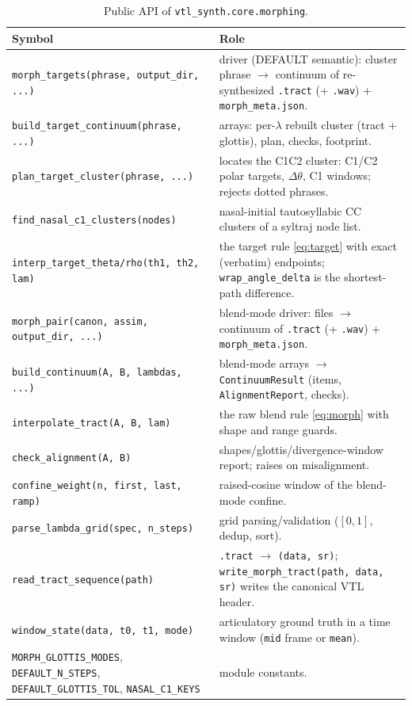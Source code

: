 \documentclass[11pt,a4paper]{article}
\newcommand{\lam}{\lambda}
\newcommand{\code}[1]{\texttt{#1}}
\begin{document}
\begin{table}[t]
\centering\small
\caption{Public API of \code{vtl\_synth.core.morphing}.}\label{tab:api}
\begin{tabularx}{\textwidth}{@{}>{\raggedright\arraybackslash}p{5.9cm} >{\raggedright\arraybackslash}X@{}}
\toprule
Symbol & Role \\
\midrule
\code{morph\_targets(phrase, output\_dir, ...)} & driver (DEFAULT
semantic): cluster phrase $\to$ continuum of re-synthesized
\code{.tract} (+ \code{.wav}) + \code{morph\_meta.json}. \\
\code{build\_target\_continuum(phrase, ...)} & arrays: per-$\lam$
rebuilt cluster (tract + glottis), plan, checks, footprint. \\
\code{plan\_target\_cluster(phrase, ...)} & locates the C1C2
cluster: C1/C2 polar targets, $\Delta\theta$, C1 windows; rejects
dotted phrases. \\
\code{find\_nasal\_c1\_clusters(nodes)} & nasal-initial
tautosyllabic CC clusters of a syltraj node list. \\
\code{interp\_target\_theta/rho(th1, th2, lam)} & the target rule
\eqref{eq:target} with exact (verbatim) endpoints;
\code{wrap\_angle\_delta} is the shortest-path difference. \\
\code{morph\_pair(canon, assim, output\_dir, ...)} & blend-mode
driver: files $\to$ continuum of \code{.tract} (+ \code{.wav}) +
\code{morph\_meta.json}. \\
\code{build\_continuum(A, B, lambdas, ...)} & blend-mode arrays
$\to$ \code{ContinuumResult} (items, \code{AlignmentReport},
checks). \\
\code{interpolate\_tract(A, B, lam)} & the raw blend rule
\eqref{eq:morph} with shape and range guards. \\
\code{check\_alignment(A, B)} & shapes/glottis/divergence-window
report; raises on misalignment. \\
\code{confine\_weight(n, first, last, ramp)} & raised-cosine window
of the blend-mode confine. \\
\code{parse\_lambda\_grid(spec, n\_steps)} & grid parsing/validation
($[0,1]$, dedup, sort). \\
\code{read\_tract\_sequence(path)} & \code{.tract} $\to$
\code{(data, sr)}; \code{write\_morph\_tract(path, data, sr)} writes
the canonical VTL header. \\
\code{window\_state(data, t0, t1, mode)} & articulatory ground
truth in a time window (\code{mid} frame or \code{mean}). \\
\code{MORPH\_GLOTTIS\_MODES}, \code{DEFAULT\_N\_STEPS},
\code{DEFAULT\_GLOTTIS\_TOL}, \code{NASAL\_C1\_KEYS} & module
constants. \\
\bottomrule
\end{tabularx}
\end{table}
\end{document}
